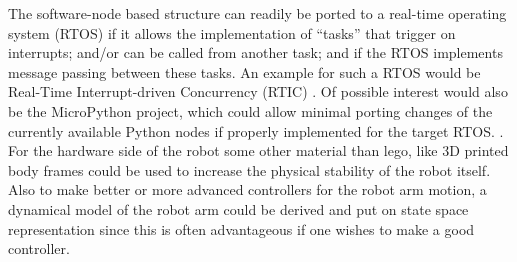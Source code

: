 The software-node based structure can readily be ported to a real-time
operating system (RTOS) if it allows the implementation of ``tasks''
that trigger on interrupts; and/or can be called from another task; and
if the RTOS implements message passing between these tasks. An example
for such a RTOS would be Real-Time Interrupt-driven Concurrency (RTIC)
\parencite{rtic}. Of possible interest would also be the MicroPython
project, which could allow minimal porting changes of the currently
available Python nodes if properly implemented for the target RTOS.
\parencite{micropython}.
For the hardware side of the robot some other material than lego, like 3D printed body frames could be used to increase the physical stability of the robot itself. Also to make better or more advanced controllers for the robot arm motion, a dynamical model of the robot arm could be derived and put on state space representation since this is often advantageous if one wishes to make a good controller.

